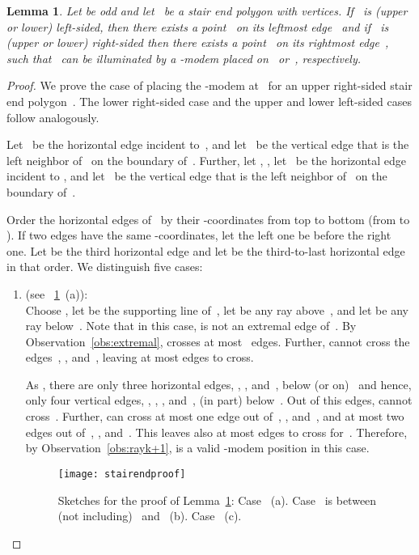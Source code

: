 \documentclass[A4]{article}
\newtheorem{lemma}[theorem]{Lemma}
\begin{document}
\begin{lemma}\label{lem:k+7}
Let  be odd and let~ be a stair end polygon with  vertices.
If~ is (upper or lower) left-sided, then there exists a point~ on its leftmost edge~ and if~ is (upper or lower) right-sided then there exists a point~ on its rightmost edge~, such that~ can be illuminated by a \mbox{-modem} placed on~ or~, respectively.
\end{lemma}
\begin{proof}
We prove the case of placing the \mbox{-modem} at~ for an upper right-sided stair end polygon~.
The lower right-sided case and the upper and lower left-sided cases follow analogously.

Let~ be the horizontal edge incident to~, and let~ be the vertical edge that is the left neighbor of~ on the boundary of~.
Further, let , , let~ be the horizontal edge incident to , and let~ be the vertical edge that is the left neighbor of~ on the boundary of~.

Order the horizontal edges of~ by their -coordinates from top to bottom (from  to ).
If two edges have the same -coordinates, let the left one be before the right one.
Let  be the third horizontal edge and let  be the third-to-last horizontal edge in that order.
We distinguish five cases:

\begin{enumerate}
\item \textbf{} (see \figurename~\ref{fig:stairendproof1-3}~(a)):\\
Choose , let  be the supporting line of~, let  be any ray above~, and let  be any ray below~.
Note that in this case,  is not an extremal edge of~. 
By Observation~\ref{obs:extremal},  crosses at most~ edges.
Further,  cannot cross the edges~, , and~, leaving at most  edges to cross.

As , there are only three horizontal edges, , , and~, below (or on)~ and hence, only four vertical edges, , , , and~, (in part) below~. 
Out of this  edges,  cannot cross~.
Further,  can cross at most one edge out of~, , and~, and at most two edges out of~, , and~.
This leaves also at most  edges to cross for~.
Therefore, by Observation~\ref{obs:rayk+1},  is a valid \mbox{-modem} position in this case.

\begin{figure}[htb]
  \centering
  \texttt{[image: stairendproof]}
  \caption{Sketches for the proof of Lemma~\ref{lem:k+7}:
	  Case~ (a).
	  Case~ is between (not including)~ and~ (b).
      Case~ (c).}
  \label{fig:stairendproof1-3}
\end{figure}


\end{enumerate}
\end{proof}
\end{document}
